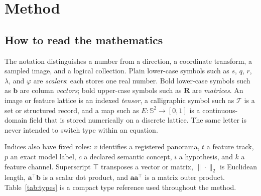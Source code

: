 \documentclass[a4paper,9pt]{extarticle}
\newcommand{\sphere}{\mathbb S^2}
\begin{document}
\section{Method}

\subsection{How to read the mathematics}

The notation distinguishes a number from a direction, a coordinate transform,
a sampled image, and a logical collection. Plain lower-case symbols such as
$s$, $q$, $r$, $\lambda$, and $\varphi$ are \emph{scalars}: each stores one
real number. Bold lower-case symbols such as $\mathbf b$ are column
\emph{vectors}; bold upper-case symbols such as $\mathbf R$ are
\emph{matrices}. An image or feature lattice is an indexed \emph{tensor}, a
calligraphic symbol such as $\mathcal T$ is a set or structured record, and a
map such as $E:\sphere\rightarrow[0,1]$ is a continuous-domain field that is
stored numerically on a discrete lattice. The same letter is never intended to
switch type within an equation.

Indices also have fixed roles: $v$ identifies a registered panorama, $t$ a
feature track, $p$ an exact model label, $c$ a declared semantic concept, $i$
a hypothesis, and $k$ a feature channel. Superscript $\top$ transposes a
vector or matrix, $\|\cdot\|_2$ is Euclidean length, $\mathbf a^\top\mathbf b$
is a scalar dot product, and $\mathbf a\mathbf a^\top$ is a matrix outer
product. Table~\ref{tab:types} is a compact type reference used throughout the
method.
\end{document}
